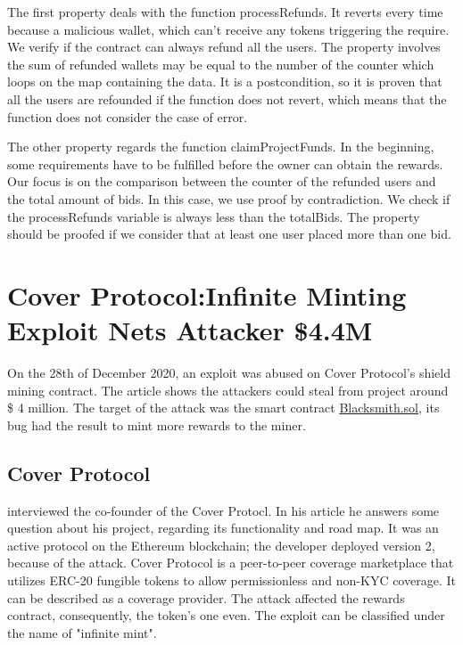 The first property deals with the function processRefunds. 
It reverts every time because a malicious wallet, which can't receive 
any tokens triggering the require. 
We verify if the contract can always refund all the users.
The property involves the sum of refunded wallets may be equal to the number of the counter which loops on the map containing the data. 
It is a postcondition, so it is proven that all the users are refounded if the function does not revert, which means that the function does not 
consider the case of error.

The other property regards the function claimProjectFunds. 
In the beginning, some requirements have to be fulfilled before the owner can obtain the rewards.
Our focus is on the comparison between the counter of the refunded users and the total amount of bids.
In this case, we use proof by contradiction. We check if the processRefunds variable is always less than the totalBids. 
The property should be proofed if we consider that at least one user placed more than one bid.





\section{Cover Protocol:Infinite Minting Exploit Nets Attacker \$4.4M }
\label{sec:Exploits:CoverProtocol}
On the 28th of December 2020, an exploit was abused on Cover Protocol's shield mining contract. 
The article shows the attackers could steal from project around \$ 4 million. 
The target of the attack was the smart contract \href{https://github.com/CoverProtocol/cover-token-mining/blob/main/contracts/Blacksmith.sol}{Blacksmith.sol}, its bug had the result to mint more rewards to the miner. 

\subsection{Cover Protocol}
\label{sec:CoverProtocol:Presentation}

\citet{CoverProtocol} interviewed the co-founder of the Cover Protocl. In his article he answers some question about his project, regarding its functionality and road map. 
It was an active protocol on the Ethereum blockchain; the developer deployed version 2,  because of the attack. 
Cover Protocol is a peer-to-peer coverage marketplace that utilizes ERC-20 fungible tokens to allow permissionless and non-KYC coverage. 
It can be described as a coverage provider.
The attack affected the rewards contract, consequently, the token's one even.  
The exploit can be classified under the name of "infinite mint".

